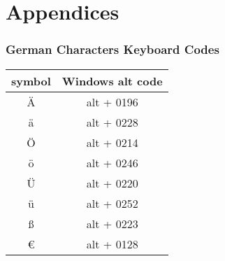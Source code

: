 \documentclass{article} %
\begin{document}


\pagebreak
{}
\section{Appendices}

\subsubsection{German Characters Keyboard Codes}

\Huge

\begin{center}\begin{tabular}{c|c}
  \textbf{symbol} & \textbf{Windows alt code} \\
  \hline
  {\"A} & alt + 0196 \\
  {\"a} & alt + 0228 \\
  {\"O} & alt + 0214 \\
  {\"o} & alt + 0246 \\
  {\"U} & alt + 0220 \\
  {\"u} & alt + 0252 \\
  {\ss} & alt + 0223 \\
  \euro{} & alt + 0128 \\
\end{tabular}\end{center}

\normalsize

%
%
\end{document}
